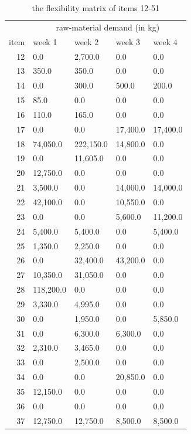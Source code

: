 \documentclass[preprint, 3p,
authoryear]{elsarticle} %
\begin{document}
\begin{table}[!h]

\caption{\label{tab:unnamed-chunk-7}the flexibility matrix of items 12-51}
\centering
\begin{tabular}[t]{r|l|l|l|l}
\hline
\multicolumn{1}{c|}{ } & \multicolumn{4}{c}{raw-material demand (in kg)} \\
\cline{2-5}
item & week 1 & week 2 & week 3 & week 4\\
\hline
12 & 0.0 & 2,700.0 & 0.0 & 0.0\\
\hline
13 & 350.0 & 350.0 & 0.0 & 0.0\\
\hline
14 & 0.0 & 300.0 & 500.0 & 200.0\\
\hline
15 & 85.0 & 0.0 & 0.0 & 0.0\\
\hline
16 & 110.0 & 165.0 & 0.0 & 0.0\\
\hline
17 & 0.0 & 0.0 & 17,400.0 & 17,400.0\\
\hline
18 & 74,050.0 & 222,150.0 & 14,800.0 & 0.0\\
\hline
19 & 0.0 & 11,605.0 & 0.0 & 0.0\\
\hline
20 & 12,750.0 & 0.0 & 0.0 & 0.0\\
\hline
21 & 3,500.0 & 0.0 & 14,000.0 & 14,000.0\\
\hline
22 & 42,100.0 & 0.0 & 10,550.0 & 0.0\\
\hline
23 & 0.0 & 0.0 & 5,600.0 & 11,200.0\\
\hline
24 & 5,400.0 & 5,400.0 & 0.0 & 5,400.0\\
\hline
25 & 1,350.0 & 2,250.0 & 0.0 & 0.0\\
\hline
26 & 0.0 & 32,400.0 & 43,200.0 & 0.0\\
\hline
27 & 10,350.0 & 31,050.0 & 0.0 & 0.0\\
\hline
28 & 118,200.0 & 0.0 & 0.0 & 0.0\\
\hline
29 & 3,330.0 & 4,995.0 & 0.0 & 0.0\\
\hline
30 & 0.0 & 1,950.0 & 0.0 & 5,850.0\\
\hline
31 & 0.0 & 6,300.0 & 6,300.0 & 0.0\\
\hline
32 & 2,310.0 & 3,465.0 & 0.0 & 0.0\\
\hline
33 & 0.0 & 2,500.0 & 0.0 & 0.0\\
\hline
34 & 0.0 & 0.0 & 20,850.0 & 0.0\\
\hline
35 & 12,150.0 & 0.0 & 0.0 & 0.0\\
\hline
36 & 0.0 & 0.0 & 0.0 & 0.0\\
\hline
37 & 12,750.0 & 12,750.0 & 8,500.0 & 8,500.0\\

\end{tabular}
\end{table}
\end{document}
